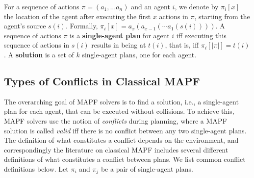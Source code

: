\documentclass[letterpaper]{article} %
\newcommand{\comment}[1]{{\nb{\textbf{Comment:}}{orange}{#1}}}
\begin{document}
For a sequence of actions $\pi=(a_1,\ldots a_n)$ 
and an agent $i$,  
we denote by $\pi_i[x]$ 
the location of the agent after executing  the first $x$ actions in $\pi$, starting from the agent's source $s(i)$. 
Formally, $\pi_i[x]=a_x(a_{x-1}(\cdots a_1(s(i))))$. 
A sequence of actions $\pi$ is a \textbf{single-agent plan} for agent $i$ iff executing this sequence of actions in $s(i)$ results in being at $t(i)$, 
that is, iff $\pi_i[|\pi|]=t(i)$. 
A \textbf{solution} is a set of $k$ single-agent plans, one for each agent.  


\subsection{Types of Conflicts in Classical MAPF}

The overarching goal of MAPF solvers is to find a solution, i.e., a single-agent plan for each agent, that can be executed without collisions. To achieve this, MAPF solvers use the notion of \emph{conflicts} during planning, where a MAPF solution is called \emph{valid} iff there is no conflict between any two single-agent plans. The definition of what constitutes a conflict depends on the environment, and correspondingly the literature on classical MAPF includes several different definitions of what constitutes a conflict between plans. We list common conflict definitions below. Let $\pi_i$ and $\pi_j$ be a pair of single-agent plans.

\end{document}
